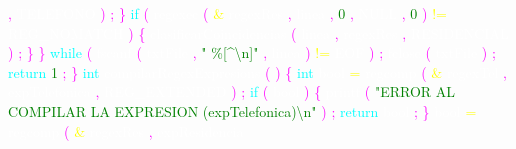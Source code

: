 \textcolor{magenta}{,} 
\textcolor{white}{TELEFONO} 
\textcolor{magenta}{)} 
\textcolor{magenta}{;} 
\textcolor{magenta}{\}} 
\textcolor{cyan}{if} 
\textcolor{magenta}{(} 
\textcolor{white}{regexec} 
\textcolor{magenta}{(} 
\textcolor{yellow}{\&} 
\textcolor{white}{regexRes} 
\textcolor{magenta}{,} 
\textcolor{white}{linea} 
\textcolor{magenta}{,} 
\textcolor{green}{0} 
\textcolor{magenta}{,} 
\textcolor{white}{NULL} 
\textcolor{magenta}{,} 
\textcolor{green}{0} 
\textcolor{magenta}{)} 
\textcolor{yellow}{!=} 
\textcolor{white}{REG\_NOMATCH} 
\textcolor{magenta}{)} 
\textcolor{magenta}{\{} 
\textcolor{white}{clasificarCoincidencias} 
\textcolor{magenta}{(} 
\textcolor{white}{linea} 
\textcolor{magenta}{,} 
\textcolor{white}{regexRes} 
\textcolor{magenta}{,} 
\textcolor{white}{RESIDENCIAL} 
\textcolor{magenta}{)} 
\textcolor{magenta}{;} 
\textcolor{magenta}{\}} 
\textcolor{magenta}{\}} 
\textcolor{cyan}{while} 
\textcolor{magenta}{(} 
\textcolor{white}{fscanf} 
\textcolor{magenta}{(} 
\textcolor{white}{txtFile} 
\textcolor{magenta}{,} 
\textcolor{green}{" \%[\textasciicircum \textbackslash n]"} 
\textcolor{magenta}{,} 
\textcolor{white}{linea} 
\textcolor{magenta}{)} 
\textcolor{yellow}{!=} 
\textcolor{white}{EOF} 
\textcolor{magenta}{)} 
\textcolor{magenta}{;} 
\textcolor{white}{fclose} 
\textcolor{magenta}{(} 
\textcolor{white}{txtFile} 
\textcolor{magenta}{)} 
\textcolor{magenta}{;} 
\textcolor{cyan}{return} 
\textcolor{green}{1} 
\textcolor{magenta}{;} 
\textcolor{magenta}{\}} 
\textcolor{cyan}{int} 
\textcolor{white}{compilarRegexExpresions} 
\textcolor{magenta}{(} 
\textcolor{magenta}{)} 
\textcolor{magenta}{\{} 
\textcolor{cyan}{int} 
\textcolor{white}{bool} 
\textcolor{yellow}{=} 
\textcolor{white}{regcomp} 
\textcolor{magenta}{(} 
\textcolor{yellow}{\&} 
\textcolor{white}{regexTel} 
\textcolor{magenta}{,} 
\textcolor{white}{expTelefonica} 
\textcolor{magenta}{,} 
\textcolor{white}{REG\_EXTENDED} 
\textcolor{magenta}{)} 
\textcolor{magenta}{;} 
\textcolor{cyan}{if} 
\textcolor{magenta}{(} 
\textcolor{white}{bool} 
\textcolor{magenta}{)} 
\textcolor{magenta}{\{} 
\textcolor{white}{printf} 
\textcolor{magenta}{(} 
\textcolor{green}{"ERROR AL COMPILAR LA EXPRESION (expTelefonica)\textbackslash n"} 
\textcolor{magenta}{)} 
\textcolor{magenta}{;} 
\textcolor{cyan}{return} 
\textcolor{white}{bool} 
\textcolor{magenta}{;} 
\textcolor{magenta}{\}} 
\textcolor{white}{bool} 
\textcolor{yellow}{=} 
\textcolor{white}{regcomp} 
\textcolor{magenta}{(} 
\textcolor{yellow}{\&} 
\textcolor{white}{regexRes} 
\textcolor{magenta}{,} 
\textcolor{white}{expResidencia} 
